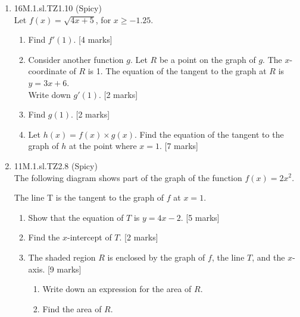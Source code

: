 \documentclass[12pt, twoside]{article}
\begin{document}
\begin{enumerate}
    \item 16M.1.sl.TZ1.10 (Spicy)\\
    Let $f(x)=\sqrt{4x+5}$, for $x \geq -1.25$.
    \begin{enumerate}
      \item Find $f'(1)$. [4 marks]
      \item Consider another function $g$. Let $R$ be a point on the graph of $g$. The $x$-coordinate of $R$ is 1. The equation of the tangent to the graph at $R$ is  $y=3x+6$.\\
      Write down $g'(1)$. [2 marks]
      \item Find $g(1)$. [2 marks]
      \item Let $h(x)=f(x) \times g(x)$. Find the equation of the tangent to the graph of $h$ at the point where $x=1$. [7 marks]
    \end{enumerate}

\newpage

  \item 11M.1.sl.TZ2.8 (Spicy)\\
  The following diagram shows part of the graph of the function $f(x)=2x^2$.
    \begin{center}
    \end{center}
    The line T is the tangent to the graph of $f$ at $x=1$.
    \begin{enumerate}
      \item Show that the equation of $T$ is $y=4x-2$. [5 marks]
      \item Find the $x$-intercept of $T$. [2 marks]
      \item The shaded region $R$ is enclosed by the graph of $f$, the line $T$, and the $x$-axis. [9 marks]
      \begin{enumerate}
        \item Write down an expression for the area of $R$.
        \item Find the area of $R$.
      \end{enumerate}
    \end{enumerate}






\end{enumerate}
\end{document}
